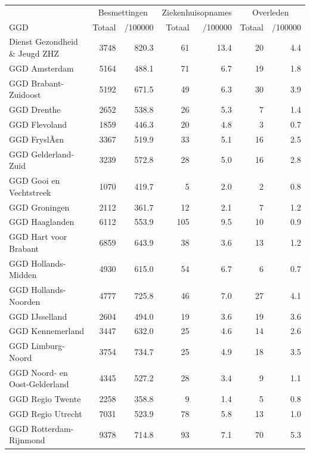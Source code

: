 \documentclass[
  english,
  man,floatsintext]{apa6}
\begin{document}
\begin{table}
\centering\begingroup\fontsize{10}{12}\selectfont

\begin{threeparttable}
\begin{tabular}{lrrrrrr}
\toprule
\multicolumn{1}{c}{ } & \multicolumn{2}{c}{Besmettingen} & \multicolumn{2}{c}{Ziekenhuisopnames} & \multicolumn{2}{c}{Overleden} \\
\cmidrule(l{3pt}r{3pt}){2-3} \cmidrule(l{3pt}r{3pt}){4-5} \cmidrule(l{3pt}r{3pt}){6-7}
GGD & Totaal & /100000 & Totaal & /100000 & Totaal & /100000\\
\midrule
Dienst Gezondheid \& Jeugd ZHZ & 3748 & 820.3 & 61 & 13.4 & 20 & 4.4\\
GGD Amsterdam & 5164 & 488.1 & 71 & 6.7 & 19 & 1.8\\
GGD Brabant-Zuidoost & 5192 & 671.5 & 49 & 6.3 & 30 & 3.9\\
GGD Drenthe & 2652 & 538.8 & 26 & 5.3 & 7 & 1.4\\
GGD Flevoland & 1859 & 446.3 & 20 & 4.8 & 3 & 0.7\\
GGD FryslÃ¢n & 3367 & 519.9 & 33 & 5.1 & 16 & 2.5\\
GGD Gelderland-Zuid & 3239 & 572.8 & 28 & 5.0 & 16 & 2.8\\
GGD Gooi en Vechtstreek & 1070 & 419.7 & 5 & 2.0 & 2 & 0.8\\
GGD Groningen & 2112 & 361.7 & 12 & 2.1 & 7 & 1.2\\
GGD Haaglanden & 6112 & 553.9 & 105 & 9.5 & 10 & 0.9\\
GGD Hart voor Brabant & 6859 & 643.9 & 38 & 3.6 & 13 & 1.2\\
GGD Hollands-Midden & 4930 & 615.0 & 54 & 6.7 & 6 & 0.7\\
GGD Hollands-Noorden & 4777 & 725.8 & 46 & 7.0 & 27 & 4.1\\
GGD IJsselland & 2604 & 494.0 & 19 & 3.6 & 19 & 3.6\\
GGD Kennemerland & 3447 & 632.0 & 25 & 4.6 & 14 & 2.6\\
GGD Limburg-Noord & 3754 & 734.7 & 25 & 4.9 & 18 & 3.5\\
GGD Noord- en Oost-Gelderland & 4345 & 527.2 & 28 & 3.4 & 9 & 1.1\\
GGD Regio Twente & 2258 & 358.8 & 9 & 1.4 & 5 & 0.8\\
GGD Regio Utrecht & 7031 & 523.9 & 78 & 5.8 & 13 & 1.0\\
GGD Rotterdam-Rijnmond & 9378 & 714.8 & 93 & 7.1 & 70 & 5.3\\

\end{tabular}
\end{threeparttable}
\end{table}
\end{document}
